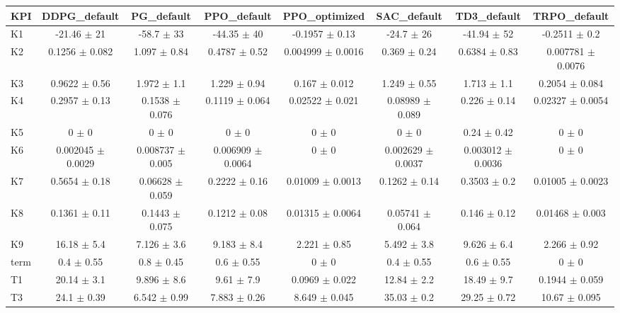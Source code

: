 \begin{tabular}{lccccccc}
\toprule
KPI & DDPG\_default & PG\_default & PPO\_default & PPO\_optimized & SAC\_default & TD3\_default & TRPO\_default \\
\midrule
K1 & -21.46 $\pm$ 21 & -58.7 $\pm$ 33 & -44.35 $\pm$ 40 & -0.1957 $\pm$ 0.13 & -24.7 $\pm$ 26 & -41.94 $\pm$ 52 & -0.2511 $\pm$ 0.2 \\
K2 & 0.1256 $\pm$ 0.082 & 1.097 $\pm$ 0.84 & 0.4787 $\pm$ 0.52 & 0.004999 $\pm$ 0.0016 & 0.369 $\pm$ 0.24 & 0.6384 $\pm$ 0.83 & 0.007781 $\pm$ 0.0076 \\
K3 & 0.9622 $\pm$ 0.56 & 1.972 $\pm$ 1.1 & 1.229 $\pm$ 0.94 & 0.167 $\pm$ 0.012 & 1.249 $\pm$ 0.55 & 1.713 $\pm$ 1.1 & 0.2054 $\pm$ 0.084 \\
K4 & 0.2957 $\pm$ 0.13 & 0.1538 $\pm$ 0.076 & 0.1119 $\pm$ 0.064 & 0.02522 $\pm$ 0.021 & 0.08989 $\pm$ 0.089 & 0.226 $\pm$ 0.14 & 0.02327 $\pm$ 0.0054 \\
K5 & 0 $\pm$ 0 & 0 $\pm$ 0 & 0 $\pm$ 0 & 0 $\pm$ 0 & 0 $\pm$ 0 & 0.24 $\pm$ 0.42 & 0 $\pm$ 0 \\
K6 & 0.002045 $\pm$ 0.0029 & 0.008737 $\pm$ 0.005 & 0.006909 $\pm$ 0.0064 & 0 $\pm$ 0 & 0.002629 $\pm$ 0.0037 & 0.003012 $\pm$ 0.0036 & 0 $\pm$ 0 \\
K7 & 0.5654 $\pm$ 0.18 & 0.06628 $\pm$ 0.059 & 0.2222 $\pm$ 0.16 & 0.01009 $\pm$ 0.0013 & 0.1262 $\pm$ 0.14 & 0.3503 $\pm$ 0.2 & 0.01005 $\pm$ 0.0023 \\
K8 & 0.1361 $\pm$ 0.11 & 0.1443 $\pm$ 0.075 & 0.1212 $\pm$ 0.08 & 0.01315 $\pm$ 0.0064 & 0.05741 $\pm$ 0.064 & 0.146 $\pm$ 0.12 & 0.01468 $\pm$ 0.003 \\
K9 & 16.18 $\pm$ 5.4 & 7.126 $\pm$ 3.6 & 9.183 $\pm$ 8.4 & 2.221 $\pm$ 0.85 & 5.492 $\pm$ 3.8 & 9.626 $\pm$ 6.4 & 2.266 $\pm$ 0.92 \\
term & 0.4 $\pm$ 0.55 & 0.8 $\pm$ 0.45 & 0.6 $\pm$ 0.55 & 0 $\pm$ 0 & 0.4 $\pm$ 0.55 & 0.6 $\pm$ 0.55 & 0 $\pm$ 0 \\
T1 & 20.14 $\pm$ 3.1 & 9.896 $\pm$ 8.6 & 9.61 $\pm$ 7.9 & 0.0969 $\pm$ 0.022 & 12.84 $\pm$ 2.2 & 18.49 $\pm$ 9.7 & 0.1944 $\pm$ 0.059 \\
T3 & 24.1 $\pm$ 0.39 & 6.542 $\pm$ 0.99 & 7.883 $\pm$ 0.26 & 8.649 $\pm$ 0.045 & 35.03 $\pm$ 0.2 & 29.25 $\pm$ 0.72 & 10.67 $\pm$ 0.095 \\
\bottomrule
\end{tabular}
